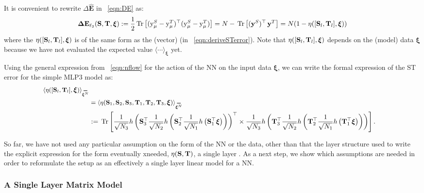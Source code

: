 It is convenient to rewrite $\Delta \mathbf{\hat{E}}$ in \EQN~\ref{eqn:DE} as:
\begin{align}
\label{eqn:DE2}
\mathbf{\Delta {E}}_{\ell_2}({\mathbf{S}},{\mathbf{T}}, \boldsymbol{\xi})
   := \frac{1}{2} \mbox{}\operatorname{Tr}\left[ (\mathrm{y}_{\mu}^{S} - \mathrm{y}_{\mu}^{T})^\top (\mathrm{y}_{\mu}^{S} - \mathrm{y}_{\mu}^{T}) \right]
   = N - \mbox{}\operatorname{Tr}\left[ (\mathbf{y}^{S})^{\top} \, \mathbf{y}^{T}  \right]
   = N(1 - \eta([{\mathbf{S}}_l,{\mathbf{T}}_l],\boldsymbol{\xi}))
\end{align}
where the \SelfOverlap $\eta([{\mathbf{S}}_l,{\mathbf{T}}_l],\boldsymbol{\xi})$
is of the same form as the (vector) \LinearPerceptron (in \EQN~\ref{eqn:deriveSTerror}).
Note that $\eta([{\mathbf{S}}_l,{\mathbf{T}}_l],\boldsymbol{\xi})$ depends on the (model) data $\boldsymbol{\xi}$
because we have not evaluated the expected value $\langle \cdots \rangle_{\boldsymbol{\xi}}$ yet.

Using the general expression from \EQN~\ref{eqn:nflow} for the action of the NN on the input data $\boldsymbol{\xi}$,
we can write the formal expression of the ST error for the simple MLP3 model as:
\begin{align}
\label{eqn:overlap1}
\ETAMLPAVG  \\ \nonumber
& =\langle\ETA(\SMAT_1,\SMAT_2,\SMAT_3,\TMAT_1,\TMAT_2,\TMAT_3,\boldsymbol{\xi})\rangle_{\AVGNDXI}  \\ \nonumber
& :=  \Trace{
    \frac{1}{\sqrt{N_3}} h\left(\mathbf{S}_3^{\top} 
    \frac{1}{\sqrt{N_2}} h\left(\mathbf{S}_2^{\top} 
    \frac{1}{\sqrt{N_1}} h\left(\mathbf{S}_1^{\top} \boldsymbol{\xi} \right)\right)\right)^{\top} 
    \times
    \frac{1}{\sqrt{N_3}} h\left(\mathbf{T}_3^{\top} 
    \frac{1}{\sqrt{N_2}} h\left(\mathbf{T}_2^{\top} 
    \frac{1}{\sqrt{N_1}} h\left(\mathbf{T}_1^{\top} \boldsymbol{\xi} \right)\right)\right)
  }.
\end{align}

So far, we have not used any particular assumption on the form of the NN or the data, 
other than that the layer structure used to write the explicit expression for the form eventually xneeded,
$\eta({\mathbf{S}},{\mathbf{T}})$, a single layer \SelfOverlap.
As a next step, we show which assumptions are needed in order to reformulate the setup as
an effectively a single layer linear model for a NN.


\subsubsection{A Single Layer Matrix Model}

